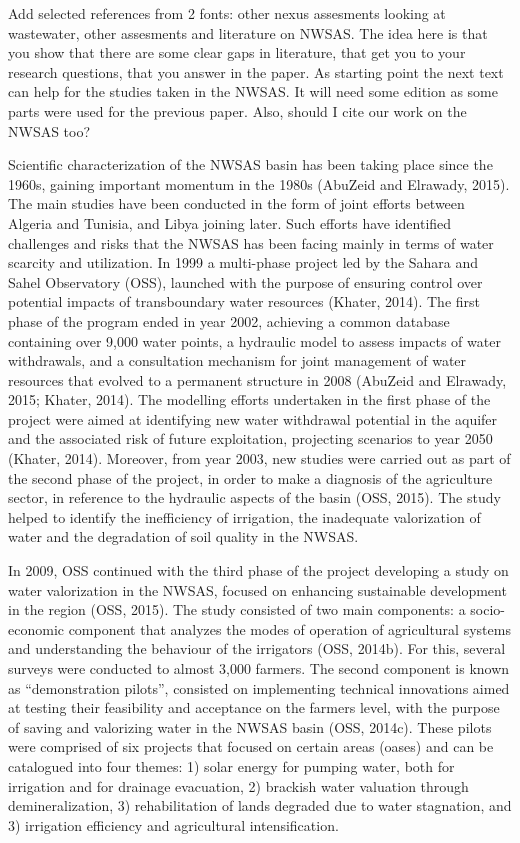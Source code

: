Add selected references from 2 fonts: other nexus assesments looking at wastewater, other assesments and literature on NWSAS. The idea here is that you show that there are some clear gaps in literature, that get you to your research questions, that you answer in the paper. As starting point the next text can help for the studies taken in the NWSAS. It will need some edition as some parts were used for the previous paper. Also, should I cite our work on the NWSAS too?

Scientific characterization of the NWSAS basin has been taking place since the 1960s, gaining important momentum in the 1980s (AbuZeid and Elrawady, 2015). The main studies have been conducted in the form of joint efforts between Algeria and Tunisia, and Libya joining later. Such efforts have identified challenges and risks that the NWSAS has been facing mainly in terms of water scarcity and utilization. In 1999 a multi-phase project led by the Sahara and Sahel Observatory (OSS), launched with the purpose of ensuring control over potential impacts of transboundary water resources (Khater, 2014). The first phase of the program ended in year 2002, achieving a common database containing over 9,000 water points, a hydraulic model to assess impacts of water withdrawals, and a consultation mechanism for joint management of water resources that evolved to a permanent structure in 2008 (AbuZeid and Elrawady, 2015; Khater, 2014). The modelling efforts undertaken in the first phase of the project were aimed at identifying new water withdrawal potential in the aquifer and the associated risk of future exploitation, projecting scenarios to year 2050 (Khater, 2014). Moreover, from year 2003, new studies were carried out as part of the second phase of the project, in order to make a diagnosis of the agriculture sector, in reference to the hydraulic aspects of the basin (OSS, 2015). The study helped to identify the inefficiency of irrigation, the inadequate valorization of water and the degradation of soil quality in the NWSAS.

In 2009, OSS continued with the third phase of the project developing a study on water valorization in the NWSAS, focused on enhancing sustainable development in the region (OSS, 2015). The study consisted of two main components: a socio-economic component that analyzes the modes of operation of agricultural systems and understanding the behaviour of the irrigators (OSS, 2014b). For this, several surveys were conducted to almost 3,000 farmers. The second component is known as “demonstration pilots”, consisted on implementing technical innovations aimed at testing their feasibility and acceptance on the farmers level, with the purpose of saving and valorizing water in the NWSAS basin (OSS, 2014c). These pilots were comprised of six projects that focused on certain areas (oases) and can be catalogued into four themes: 1) solar energy for pumping water, both for irrigation and for drainage evacuation, 2) brackish water valuation through demineralization, 3) rehabilitation of lands degraded due to water stagnation, and 3) irrigation efficiency and agricultural intensification.


